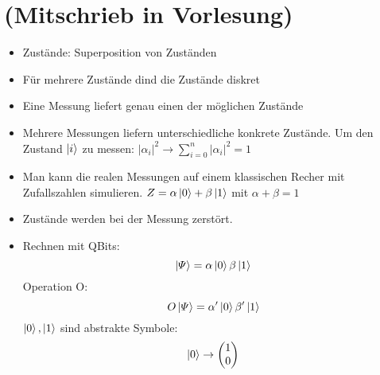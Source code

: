 \chapter{(Mitschrieb in Vorlesung)}
\begin{itemize}
\item Zustände: Superposition von Zuständen
\item Für mehrere Zustände dind die Zustände diskret
\item Eine Messung liefert genau einen der möglichen Zustände
\item Mehrere Messungen liefern unterschiedliche konkrete Zustände. Um den Zustand $\ket{i}$ zu messen: $\left\lvert \alpha_i \right\rvert ^2 \rightarrow \sum_{i = 0}^{n} \left\lvert \alpha_i \right\rvert ^2 = 1$
\item Man kann die realen Messungen auf einem klassischen Recher mit Zufallszahlen simulieren.
$Z=\alpha\ket{0}+\beta\ket{1}$ mit $\alpha + \beta = 1$
\item Zustände werden bei der Messung zerstört.
\item Rechnen mit QBits: \\
$$
\ket{\varPsi} = \alpha\ket{0}\beta\ket{1}
$$
Operation O:
$$
O \ket{\varPsi} = \alpha'\ket{0}\beta'\ket{1}
$$
$\ket{0},\ket{1}$ sind abstrakte Symbole:
$$
\ket{0}\rightarrow \begin{pmatrix}
    1 \\ 0
\end{pmatrix}
$$
\end{itemize}

